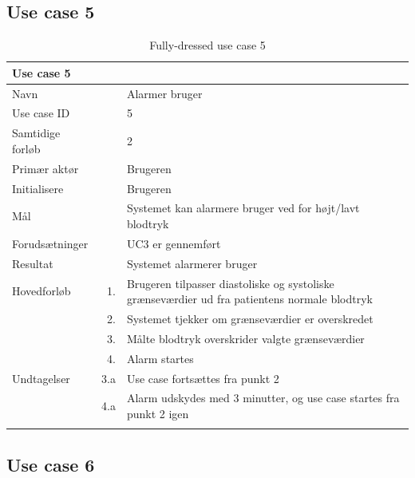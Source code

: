 \subsection{Use case 5}

\begin{longtabu} to  %
    {\large \textbf{Use case 5}} && \\
    \toprule
    Navn &&    Alarmer bruger\\
    Use case ID &&    5\\
    Samtidige forløb &&    2\\
    Primær aktør &&    Brugeren\\
    Initialisere &&   Brugeren\\
    Mål && Systemet kan alarmere bruger ved for højt/lavt blodtryk\\
    Forudsætninger && UC3 er gennemført\\
    Resultat &&    Systemet alarmerer bruger                    \\ \midrule
    Hovedforløb &    1. &    Brugeren tilpasser diastoliske og systoliske grænseværdier ud fra patientens normale blodtryk\\ 
    			& 	 2. & 	Systemet tjekker om grænseværdier er overskredet\\ 
    			&	 3. & 	Målte blodtryk overskrider valgte grænseværdier\\ 
    			& 	 4. & 	Alarm startes \\ \midrule            
    Undtagelser &    3.a & Use case fortsættes fra punkt 2 \\ 
    			&	 4.a & Alarm udskydes med 3 minutter, og use case startes fra punkt 2 igen\\ \bottomrule
\caption{Fully-dressed use case 5}
\label{UC5}
\end{longtabu}

\subsection{Use case 6}

